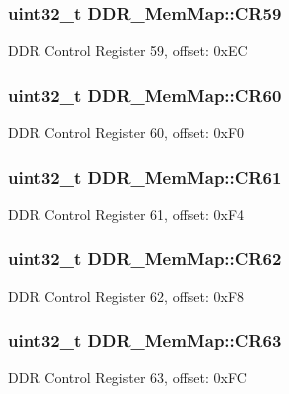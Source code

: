 \subsubsection[{C\+R59}]{\setlength{\rightskip}{0pt plus 5cm}uint32\+\_\+t D\+D\+R\+\_\+\+Mem\+Map\+::\+C\+R59}\label{struct_d_d_r___mem_map_a5514954901a16a381f9845054781d61e}
D\+D\+R Control Register 59, offset\+: 0x\+E\+C \hypertarget{struct_d_d_r___mem_map_a52c019cf023a9f688f9fdbaf85800fd3}{}
\subsubsection[{C\+R60}]{\setlength{\rightskip}{0pt plus 5cm}uint32\+\_\+t D\+D\+R\+\_\+\+Mem\+Map\+::\+C\+R60}\label{struct_d_d_r___mem_map_a52c019cf023a9f688f9fdbaf85800fd3}
D\+D\+R Control Register 60, offset\+: 0x\+F0 \hypertarget{struct_d_d_r___mem_map_a216b377b6e1ee9df757fd96723a4ff60}{}
\subsubsection[{C\+R61}]{\setlength{\rightskip}{0pt plus 5cm}uint32\+\_\+t D\+D\+R\+\_\+\+Mem\+Map\+::\+C\+R61}\label{struct_d_d_r___mem_map_a216b377b6e1ee9df757fd96723a4ff60}
D\+D\+R Control Register 61, offset\+: 0x\+F4 \hypertarget{struct_d_d_r___mem_map_a51f5fd363a0d54e1c44953de91f0d004}{}
\subsubsection[{C\+R62}]{\setlength{\rightskip}{0pt plus 5cm}uint32\+\_\+t D\+D\+R\+\_\+\+Mem\+Map\+::\+C\+R62}\label{struct_d_d_r___mem_map_a51f5fd363a0d54e1c44953de91f0d004}
D\+D\+R Control Register 62, offset\+: 0x\+F8 \hypertarget{struct_d_d_r___mem_map_a14ab276105c6080e182c2f53f33cdcc7}{}
\subsubsection[{C\+R63}]{\setlength{\rightskip}{0pt plus 5cm}uint32\+\_\+t D\+D\+R\+\_\+\+Mem\+Map\+::\+C\+R63}\label{struct_d_d_r___mem_map_a14ab276105c6080e182c2f53f33cdcc7}
D\+D\+R Control Register 63, offset\+: 0x\+F\+C \hypertarget{struct_d_d_r___mem_map_abeb11d4cc28f5bb277d0cd4a46cb2ce1}{}
